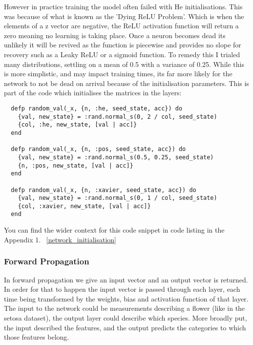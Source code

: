However in practice training the model often failed with He initialisations.
This was because of what is known as the 'Dying ReLU Problem'. Which is when the
elements of a z vector are negative, the ReLU activation function
will return a zero meaning no learning is taking place. Once a neuron becomes
dead its unlikely it will be revived as the function is piecewise and provides
no slope for recovery such as a Leaky ReLU or a sigmoid function. To remedy this
I trialed many distributions, settling on a mean of 0.5 with a variance of 0.25.
While this is more simplistic, and may impact training times, its far more
likely for the network to not be dead on arrival because of the initialisation
parameters. This is part of the code which initialises the matrices in the layers:
\begin{lstlisting}
  defp random_val(_x, {n, :he, seed_state, acc}) do
    {val, new_state} = :rand.normal_s(0, 2 / col, seed_state)
    {col, :he, new_state, [val | acc]}
  end

  defp random_val(_x, {n, :pos, seed_state, acc}) do
    {val, new_state} = :rand.normal_s(0.5, 0.25, seed_state)
    {n, :pos, new_state, [val | acc]}
  end

  defp random_val(_x, {n, :xavier, seed_state, acc}) do
    {val, new_state} = :rand.normal_s(0, 1 / col, seed_state)
    {col, :xavier, new_state, [val | acc]}
  end
\end{lstlisting}
You can find the wider context for this code snippet in code listing in the Appendix 1. ~\ref{network_initialisation} 


\subsubsection{Forward Propagation}
In forward propagation we give an input vector and an output vector is returned.
In order for that to happen the input vector is passed through each layer, each
time being transformed by the weights, bias and activation function of that
layer. The input to the network could be measurements describing a flower (like
in the setosa dataset), the output layer could describe which species. More
broadly put, the input described the features, and the output predicts the
categories to which those features belong.

